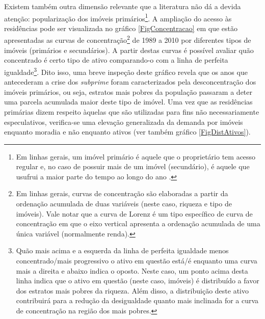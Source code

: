 Existem também outra dimensão relevante que a literatura não dá a devida atenção: popularização dos imóveis primários\footnote{
	Em linhas gerais, um imóvel primário é aquele que o proprietário tem acesso regular e, no caso de possuir mais de um imóvel (secundário), é aquele que usufrui a maior parte do tempo ao longo do ano \cite{us_census_bureau_characteristics_2017}.
}.
A ampliação do acesso às residências pode ser visualizada no gráfico \ref{FigConcentracao} em que estão apresentadas as curvas de concentração\footnote{Em linhas gerais, curvas de concentração são elaboradas a partir da ordenação acumulada de duas variáveis (neste caso, riqueza e tipo de imóveis). Vale notar que a curva de Lorenz é um tipo específico de curva de concentração em que o eixo vertical apresenta a ordenação acumulada de uma única variável (normalmente renda).} de 1989 a 2010 por diferentes tipos de imóveis (primários e secundários).
A partir destas curvas é possível avaliar quão concentrado é certo tipo de ativo comparando-o com a linha de perfeita igualdade\footnote{Quão mais acima e a esquerda da linha de perfeita igualdade menos concentrado/mais progressivo o ativo em questão está/é enquanto uma curva mais a direita e abaixo indica o oposto.
Neste caso, um ponto acima desta linha indica que o ativo em questão (neste caso, imóveis) é distribuído a favor dos estratos mais pobres da riqueza.
Além disso, a distribuição deste ativo contribuirá para a redução da desigualdade quanto mais inclinada for a curva de concentração na região dos mais pobres.
}.
Dito isso, uma breve inspeção deste gráfico revela que os anos que antecederam a crise dos \textit{subprime} foram caracterizados pela desconcentração dos imóveis primários, ou seja, estratos mais pobres da população passaram a deter uma parcela acumulada maior deste tipo de imóvel.
Uma vez que as residências primárias dizem respeito àquelas que são utilizadas para fins não necessariamente especulativos, verifica-se uma elevação generalizada da demanda por imóveis enquanto moradia e não enquanto ativos (ver também gráfico \ref{FigDistAtivos}).



